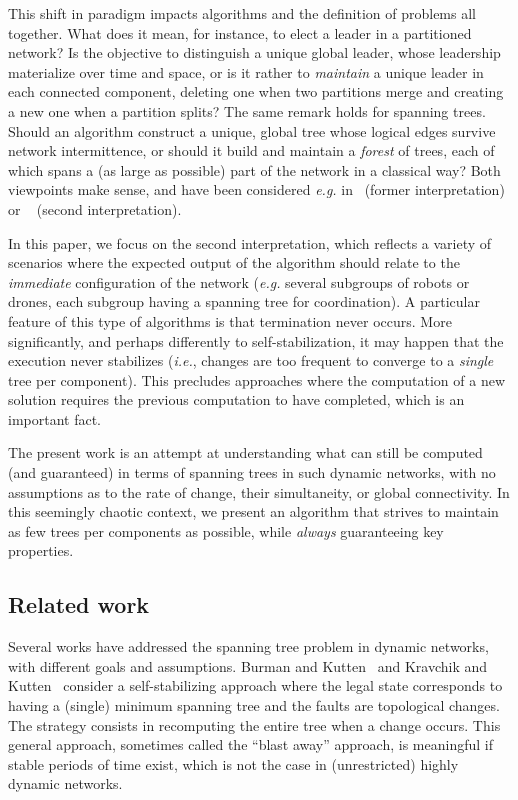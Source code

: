 \documentclass[twocolumn]{article}
\begin{document}
This shift in paradigm impacts algorithms and the definition of problems all together. What does it mean, for instance, to elect a leader in a partitioned network? Is the objective to distinguish a unique global leader, whose leadership materialize over time and space, or is it rather to {\em maintain} a unique leader in each connected component, deleting one when two partitions merge and creating a new one when a partition splits? 
The same remark holds for spanning trees. Should an algorithm construct a unique, global tree whose logical edges survive network intermittence, or should it build and maintain a {\em forest} of trees, each of which spans a (as large as possible) part of the network in a classical way? Both viewpoints make sense, and have been considered {\it e.g.} in~\cite{AE84,CFMS12} (former interpretation) or ~\cite{Awerbuch08,CCGP13} (second interpretation).

In this paper, we focus on the second interpretation, which reflects a variety of scenarios where the expected output of the algorithm should relate to the {\em immediate} configuration of the network ({\it e.g.} several subgroups of robots or drones, each subgroup having a spanning tree for coordination). A particular feature of this type of algorithms is that termination never occurs. More significantly, and perhaps differently to self-stabilization, it may happen that the execution never stabilizes ({\it i.e.}, changes are too frequent to converge to a {\em single} tree per component). This precludes approaches where the computation of a new solution requires the previous computation to have completed, which is an important fact. 


The present work is an attempt at understanding what can still be computed (and guaranteed) in terms of spanning trees in such dynamic networks, with no assumptions as to the rate of change, their simultaneity, or global connectivity. In this seemingly chaotic context, we present an algorithm that strives to maintain as few trees per components as possible, while {\em always} guaranteeing key properties.

\subsection{Related work}

Several works have addressed the spanning tree problem in dynamic networks, with different goals and assumptions. Burman and Kutten~\cite{asynchronous} and Kravchik and Kutten~\cite{synchronous} consider a self-stabilizing approach where the legal state corresponds to having a (single) minimum spanning tree and the faults are topological changes. The strategy consists in recomputing the entire tree when a change occurs. This general approach, sometimes called the ``blast away'' approach, is meaningful if stable periods of time exist, which is not the case in (unrestricted) highly dynamic networks.
\end{document}
